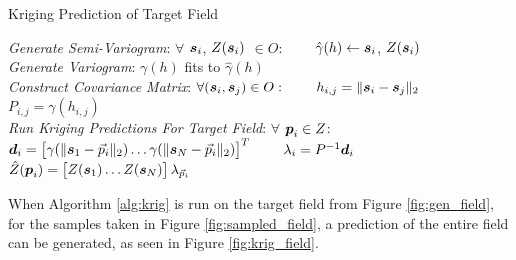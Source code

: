 \begin{algorithm}[thpb!]
\caption{Kriging Prediction of Target Field}\label{alg:krig}
\begin{algorithmic}[1]
\BState \emph{Generate Semi-Variogram}:
\State $\forall$ ${\it{\boldsymbol{s}}}_i$, $Z({\it{\boldsymbol{s}}}_i)$ $\in O$:
\State \ \ \ \ $\hat{\gamma}(h) \gets {\it{\boldsymbol{s}}}_i$, $Z({\it{\boldsymbol{s}}}_i)$\\
\BState \emph{Generate Variogram}:
\State $\gamma(h)$ fits to $\hat{\gamma}(h)$\\
\BState \emph{Construct Covariance Matrix}:
\State $\forall ({\it{\boldsymbol{s}}}_i,{\it{\boldsymbol{s}}}_j) \in O:$
\State \ \ \ \ $h_{i,j} = \|{\it{\boldsymbol{s}}}_i - {\it{\boldsymbol{s}}}_j\|_2$
\State \ \ \ \ $P_{i,j} = \gamma(h_{i,j})$\\
\BState \emph{Run Kriging Predictions For Target Field}:
\State $\forall$ ${\it{\boldsymbol{p}}}_i \in Z$:
\State \ \ \ \ ${\it{\boldsymbol{d}}}_{i} = \begin{bmatrix} \gamma(\| {\it{\boldsymbol{s}}}_1 - \vec{p}_i \|_2) \dots \gamma(\| {\it{\boldsymbol{s}}}_N - \vec{p}_i \|_2) \end{bmatrix}^T$
\State \ \ \ \ $\lambda_{i} = P^{-1}{\it{\boldsymbol{d}}}_{i}$
\State \ \ \ \ $\hat{Z}({\it{\boldsymbol{p}}}_i) = \begin{bmatrix} Z({\it{\boldsymbol{s}}}_1) \dots Z({\it{\boldsymbol{s}}}_N) \end{bmatrix} \lambda_{\vec{p}_i}$
\EndProcedure
\end{algorithmic}
\end{algorithm}

When Algorithm \ref{alg:krig} is run on the target field from Figure \ref{fig:gen_field}, for the samples taken in Figure \ref{fig:sampled_field}, a prediction of the entire field can be generated, as seen in Figure \ref{fig:krig_field}.
